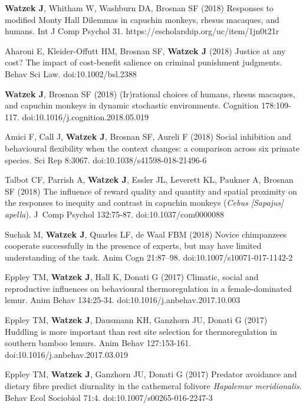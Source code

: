 \documentclass[]{friggeri-cv}
\begin{document}
\begin{enumerate}[label={[\,\arabic*\,]}]
  \item \textbf{Watzek J}, Whitham W, Washburn DA, Brosnan SF (2018) Responses to modified Monty Hall Dilemmas in capuchin monkeys, rhesus macaques, and humans. Int J Comp Psychol 31. https://escholarship.org/uc/item/1jn0t21r
  \item Aharoni E, Kleider-Offutt HM, Brosnan SF, \textbf{Watzek J} (2018) Justice at any cost? The impact of cost-benefit salience on criminal punishment judgments. Behav Sci Law. doi:10.1002/bsl.2388
  \item \textbf{Watzek J}, Brosnan SF (2018) (Ir)rational choices of humans, rhesus macaques, and capuchin monkeys in dynamic stochastic environments. Cognition 178:109-117. doi:10.1016/j.cognition.2018.05.019
  \item Amici F, Call J, \textbf{Watzek J}, Brosnan SF, Aureli F (2018) Social inhibition and behavioural flexibility when the context changes: a comparison across six primate species. Sci Rep 8:3067. doi:10.1038/s41598-018-21496-6
  \item Talbot CF, Parrish A, \textbf{Watzek J}, Essler JL, Leverett KL, Paukner A, Brosnan SF (2018) The influence of reward quality and quantity and spatial proximity on the responses to inequity and contrast in capuchin monkeys (\emph{Cebus [Sapajus] apella}). J~Comp Psychol 132:75-87. doi:10.1037/com0000088
  \item Suchak M, \textbf{Watzek J}, Quarles LF, de Waal FBM (2018) Novice chimpanzees cooperate successfully in the presence of experts, but may have limited understanding of the task. Anim Cogn 21:87–98. doi:10.1007/s10071-017-1142-2
  \item Eppley TM, \textbf{Watzek J}, Hall K, Donati G (2017) Climatic, social and reproductive influences on behavioural thermoregulation in a female-dominated lemur. Anim Behav 134:25-34. doi:10.1016/j.anbehav.2017.10.003
  \item Eppley TM, \textbf{Watzek J}, Dausmann KH, Ganzhorn JU, Donati G (2017) Huddling is more important than rest site selection for thermoregulation in southern bamboo lemurs. Anim Behav 127:153-161. doi:10.1016/j.anbehav.2017.03.019
  \item \enlargethispage{1.5\baselineskip} Eppley TM, \textbf{Watzek J}, Ganzhorn JU, Donati G (2017) Predator avoidance and dietary fibre predict diurnality in the cathemeral folivore \emph{Hapalemur meridionalis}. Behav Ecol Sociobiol 71:4. doi:10.1007/s00265-016-2247-3
\end{enumerate}
\end{document}
